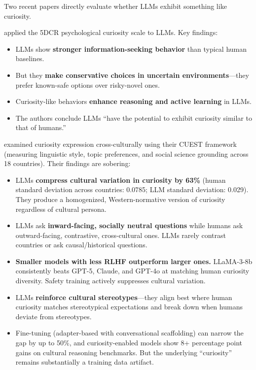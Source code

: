 Two recent papers directly evaluate whether LLMs exhibit something like curiosity.

\citet{wang2025} applied the 5DCR psychological curiosity scale to LLMs. Key findings:
\begin{itemize}[leftmargin=*]
  \item LLMs show \textbf{stronger information-seeking behavior} than typical human baselines.
  \item But they \textbf{make conservative choices in uncertain environments}---they prefer known-safe options over risky-novel ones.
  \item Curiosity-like behaviors \textbf{enhance reasoning and active learning} in LLMs.
  \item The authors conclude LLMs ``have the potential to exhibit curiosity similar to that of humans.''
\end{itemize}

\citet{borah2025} examined curiosity expression cross-culturally using their CUEST framework (measuring linguistic style, topic preferences, and social science grounding across 18 countries). Their findings are sobering:
\begin{itemize}[leftmargin=*]
  \item LLMs \textbf{compress cultural variation in curiosity by 63\%} (human standard deviation across countries: 0.0785; LLM standard deviation: 0.029). They produce a homogenized, Western-normative version of curiosity regardless of cultural persona.
  \item LLMs ask \textbf{inward-facing, socially neutral questions} while humans ask outward-facing, contrastive, cross-cultural ones. LLMs rarely contrast countries or ask causal/historical questions.
  \item \textbf{Smaller models with less RLHF outperform larger ones.} LLaMA-3-8b consistently beats GPT-5, Claude, and GPT-4o at matching human curiosity diversity. Safety training actively suppresses cultural variation.
  \item LLMs \textbf{reinforce cultural stereotypes}---they align best where human curiosity matches stereotypical expectations and break down when humans deviate from stereotypes.
  \item Fine-tuning (adapter-based with conversational scaffolding) can narrow the gap by up to 50\%, and curiosity-enabled models show 8+ percentage point gains on cultural reasoning benchmarks. But the underlying ``curiosity'' remains substantially a training data artifact.
\end{itemize}

